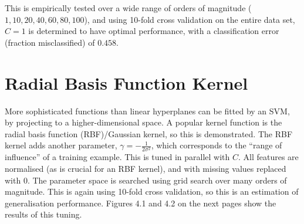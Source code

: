 \documentclass[paper=a4, fontsize=11pt]{scrartcl}
\numberwithin{equation}{section}
\numberwithin{figure}{section}
\numberwithin{table}{section}
\begin{document}
This is empirically tested over a wide range of orders of magnitude
($1,10,20,40,60,80,100$), and using 10-fold cross validation on the entire
data set, $C=1$ is determined to have optimal performance, with a classification
error (fraction misclassified) of $0.458$.

\section{Radial Basis Function Kernel}

More sophisticated functions than linear hyperplanes can be fitted by an SVM,
by projecting to a higher-dimensional space. A popular kernel function is the
radial basis function (RBF)/Gaussian kernel, so this is demonstrated. The RBF
kernel adds another parameter, $\gamma = -\frac{1}{2\sigma^2}$, which
corresponds to the ``range of influence'' of a training example. This is tuned
in parallel with $C$. All features are normalised (as is crucial for an RBF
kernel), and with missing values replaced with 0. The parameter space is
searched using grid search over many orders of magnitude. This is again using
10-fold cross validation, so this is an estimation of generalisation
performance. Figures 4.1 and 4.2 on the next pages show the results of this tuning.
\end{document}
